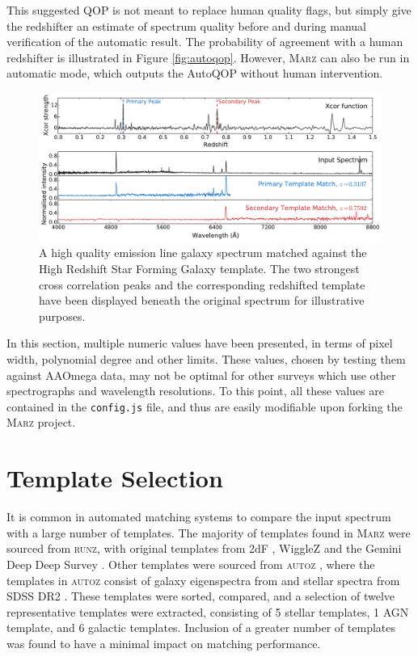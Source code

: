 \documentclass[5p]{elsarticle}
\newcommand{\runz}{\textsc{runz}}
\newcommand{\autoz}{\textsc{autoz}}
\newcommand{\marz}{\textsc{Marz}}
\begin{document}
This suggested QOP is not meant to replace human quality flags, but simply give the redshifter an estimate of spectrum quality before and during manual verification of the automatic result. The probability of agreement with a human redshifter is illustrated in Figure \ref{fig:autoqop}.  However, \marz{} can also be run in automatic mode, which outputs the AutoQOP without human intervention.






\begin{figure}[h]
\centering
\includegraphics[width=\textwidth]{xcors.pdf}
\caption{A high quality emission line galaxy spectrum matched against the High Redshift Star Forming Galaxy template. The two strongest cross correlation peaks and the corresponding redshifted template have been displayed beneath the original spectrum for illustrative purposes.}
\label{fig:xcors}
\end{figure}


In this section, multiple numeric values have been presented, in terms of pixel width, polynomial degree and other limits. These values, chosen by testing them against AAOmega data, may not be optimal for other surveys which use other spectrographs and wavelength resolutions. To this point, all these values are contained in the \verb;config.js; file, and thus are easily modifiable upon forking the \marz{} project.




\section{Template Selection} \label{sec:templates}





It is common in automated matching systems to compare the input spectrum with a large number of templates. The majority of templates found in \marz{} were sourced from \runz{}, with original templates from 2dF \citep{colless2001}, WiggleZ \citep{Drinkwater2010} and the Gemini Deep Deep Survey \citet{abraham2004}. Other templates were sourced from \autoz{} \citep{baldry2014galaxy}, where the templates in \autoz{}  consist of galaxy eigenspectra from \citet{BoltonSchlegel2012} and stellar spectra from SDSS DR2 \citep{SubbaRao2002}. These templates were sorted, compared, and a selection of twelve representative templates were extracted, consisting of 5 stellar templates, 1 AGN template, and 6 galactic templates. Inclusion of a greater number of templates was found to have a minimal impact on matching performance.
\end{document}
